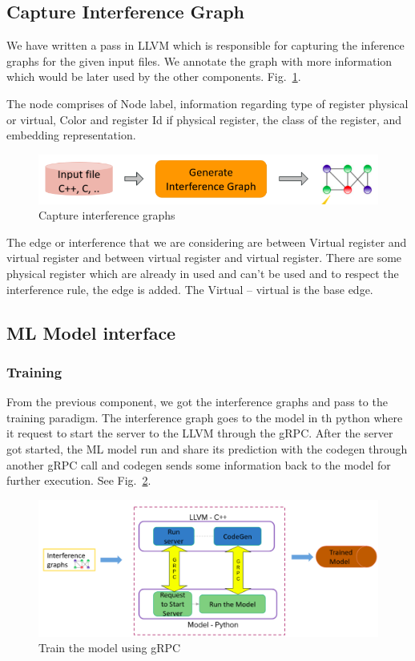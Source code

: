 \subsection{Capture Interference Graph}
We have written a pass in LLVM which is responsible for capturing the inference graphs for the given input files. We annotate the graph with more information which would be later used by the other components. Fig.~\ref{fig:mlra-cig}.

The node comprises of Node label, information regarding type of register physical or virtual, Color and register Id if physical register, the class of the register, and embedding representation.

\begin{figure}[t]
    \centering
    \includegraphics[scale=0.4]{figures/chapter-5/mlra_cig.png}
    \caption{Capture interference graphs}
     \label{fig:mlra-cig}
\end{figure}

The edge or interference that we are considering are between Virtual register and virtual register and between virtual register and virtual register. There are some physical register which are already in used and can’t be used and to respect the interference rule, the edge is added. The Virtual -- virtual is the base edge.
\subsection{ML Model interface}

\subsubsection{Training}
From the previous component, we got the interference graphs and pass to the training paradigm. The interference graph goes to the model in th python where it request to start the server to the LLVM through the gRPC. After the server got started, the ML model run and share its prediction with the codegen through another gRPC call and codegen sends some information back to the model for further execution. See Fig.~\ref{fig:mlra-training}.

\begin{figure}[t]
    \centering
    \includegraphics[scale=0.4]{figures/chapter-5/mlra_training.png}
    \caption{Train the model using gRPC}
     \label{fig:mlra-training}
\end{figure}

